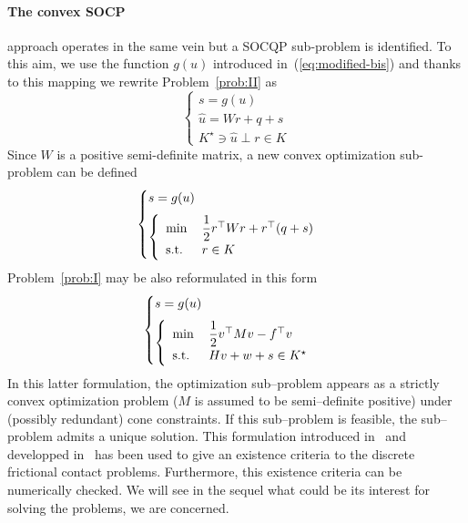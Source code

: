 \paragraph{ The convex SOCP} approach operates in the same vein but a  SOCQP sub-problem is identified. To this aim, we use the function $g(u)$ introduced in~(\ref{eq:modified-bis}) and thanks to this mapping we rewrite Problem~\ref{prob:II} as
\begin{equation}\label{eq:ACLM-2}
  \begin{cases}
    s = g(u) \\[2mm]
    \hat u = W r + q + s  \\[2mm]
    K^\star \ni {\hat u} \perp r \in K
  \end{cases}
\end{equation} 
Since $W$ is a positive semi-definite matrix, a new convex optimization sub-problem can be defined 
\begin{equation}\label{eq:ACLM-3}
  \begin{cases}
    s = g(u) \\[2mm]
    \left\{
      \begin{array}{ll}
        \min\,&\Frac 1 2 r^\top W r + r^\top (q + s)  \\
        \text{s.t. } & r \in K
      \end{array}
    \right.
  \end{cases}
\end{equation} 
Problem~\ref{prob:I} may be also reformulated in this form
\begin{equation}\label{eq:ACLM-4}
  \begin{cases}
    s = g(u) \\[2mm]
    \left\{
      \begin{array}{ll}
        \min\,&\Frac 1 2 v^\top M v -  f^\top v  \\
        \text{s.t. } & H v  + w + s  \in K^\star
      \end{array}
    \right.
  \end{cases}
\end{equation} 
In this latter formulation, the optimization sub--problem appears as a strictly convex optimization problem ($M$ is assumed to be semi--definite positive) under (possibly redundant) cone constraints. If this sub--problem is feasible, the sub--problem admits a unique solution. This formulation introduced in~\cite{Cadoux2009} and developped in~\cite{Acary.Cadoux2013,Acary.ea_ZAMM2011} has been used to give an existence criteria to the discrete frictional contact problems. Furthermore, this existence criteria can be numerically checked. We will see in the sequel what could be its interest for solving the problems, we are concerned.
\clearpage
